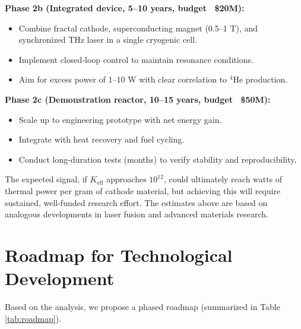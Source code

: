 \documentclass[12pt]{article}
\theoremstyle{remark}
\newcommand{\Keff}{K_{\mathrm{eff}}}
\begin{document}
	\textbf{Phase 2b (Integrated device, 5–10 years, budget ~\$20M):}
	\begin{itemize}
		\item Combine fractal cathode, superconducting magnet (0.5–1 T), and synchronized THz laser in a single cryogenic cell.
		\item Implement closed‑loop control to maintain resonance conditions.
		\item Aim for excess power of 1–10 W with clear correlation to \(^4\)He production.
	\end{itemize}
	
	\textbf{Phase 2c (Demonstration reactor, 10–15 years, budget ~\$50M):}
	\begin{itemize}
		\item Scale up to engineering prototype with net energy gain.
		\item Integrate with heat recovery and fuel cycling.
		\item Conduct long‑duration tests (months) to verify stability and reproducibility.
	\end{itemize}
	
	The expected signal, if \(\Keff\) approaches \(10^{12}\), could ultimately reach watts of thermal power per gram of cathode material, but achieving this will require sustained, well‑funded research effort. The estimates above are based on analogous developments in laser fusion and advanced materials research.
	
	\section{Roadmap for Technological Development}
	\label{sec:roadmap}
	
	Based on the analysis, we propose a phased roadmap (summarized in Table \ref{tab:roadmap}).
	
\end{document}
